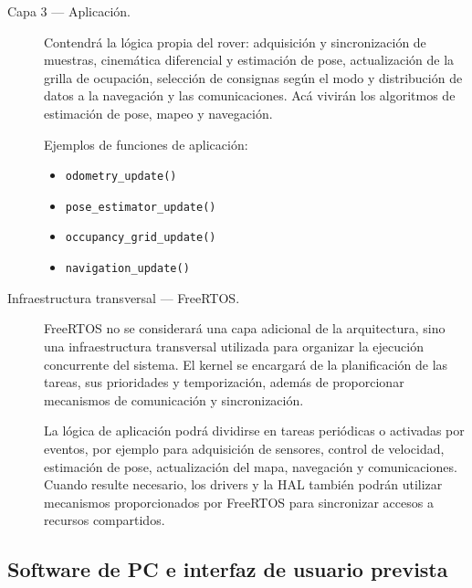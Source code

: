 \begin{description}
  \item[Capa 3 --- Aplicación.]
        Contendrá la lógica propia del rover: adquisición y sincronización de
        muestras, cinemática diferencial y estimación de pose, actualización
        de la grilla de ocupación, selección de consignas según el modo y
        distribución de datos a la navegación y las comunicaciones. Acá
        vivirán los algoritmos de estimación de pose, mapeo y navegación.

        \begin{visar}
Ejemplos de funciones de aplicación:
\begin{itemize}

  \item \texttt{odometry\_update()} 



  \item \texttt{pose\_estimator\_update()}

  \item \texttt{occupancy\_grid\_update()} 

  \item \texttt{navigation\_update()} 

\end{itemize}
        \end{visar}


  \item[Infraestructura transversal --- FreeRTOS.]
        FreeRTOS no se considerará una capa adicional de la arquitectura, sino
        una infraestructura transversal utilizada para organizar la ejecución
        concurrente del sistema. El kernel se encargará de la planificación de
        las tareas, sus prioridades y temporización, además de proporcionar
        mecanismos de comunicación y sincronización.

        La lógica de aplicación podrá dividirse en tareas periódicas o
        activadas por eventos, por ejemplo para adquisición de sensores,
        control de velocidad, estimación de pose, actualización del mapa,
        navegación y comunicaciones. Cuando resulte necesario, los drivers y
        la HAL también podrán utilizar mecanismos proporcionados por FreeRTOS
        para sincronizar accesos a recursos compartidos.

        

\end{description}

\subsection{Software de PC e interfaz de usuario prevista}

